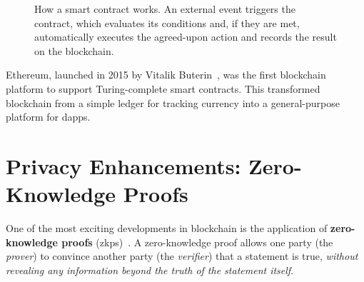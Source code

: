 \begin{figure}[htbp]
\centering
{}
\caption{How a smart contract works. An external event triggers the contract, which evaluates its conditions and, if they are met, automatically executes the agreed-upon action and records the result on the blockchain.}
\label{fig:smart-contract}
\end{figure}

Ethereum, launched in 2015 by Vitalik Buterin~\cite{buterin2014ethereum}, was the first blockchain platform to support Turing-complete smart contracts. This transformed blockchain from a simple ledger for tracking currency into a general-purpose platform for \glspl{dapp}.

\section{Privacy Enhancements: Zero-Knowledge Proofs}
\label{sec:zkp}

One of the most exciting developments in blockchain is the application of \textbf{zero-knowledge proofs} (\glspl{zkp})~\cite{goldwasser1989zk}. A zero-knowledge proof allows one party (the \emph{prover}) to convince another party (the \emph{verifier}) that a statement is true, \emph{without revealing any information beyond the truth of the statement itself}.

